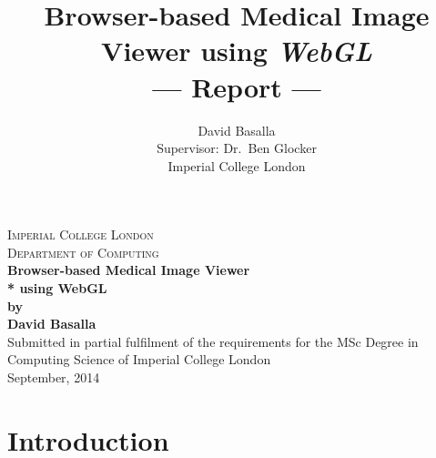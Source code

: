 \documentclass[a4paper,11pt,twoside]{article}
\title{Browser-based Medical Image Viewer using \textit{WebGL} \\\Large{--- Report ---}}
\author{David Basalla\\
  \small{Supervisor: Dr.\ Ben Glocker}\\
  \small{Imperial College London}
}
\begin{document}
\begin{titlepage}

\newcommand{\HRule}{\rule{\linewidth}{0.5mm}} %

\center %
 

\textsc{Imperial College London}\\[0.5cm] %
\textsc{Department of Computing}\\[8.5cm] %




{ \large \bfseries Browser-based Medical Image Viewer\\* using WebGL}\\[0.4cm] %
{ \large \bfseries by}\\[0.4cm] %
{ \large \bfseries David Basalla}\\[10cm] %
 



{Submitted in partial fulfilment of the requirements for the MSc Degree in Computing Science of Imperial College London }\\[0.5cm] 
{September,  2014}\\[0.5cm] %



\vfill %

\end{titlepage}



\tableofcontents


\newpage
\section{Introduction}
\end{document}
